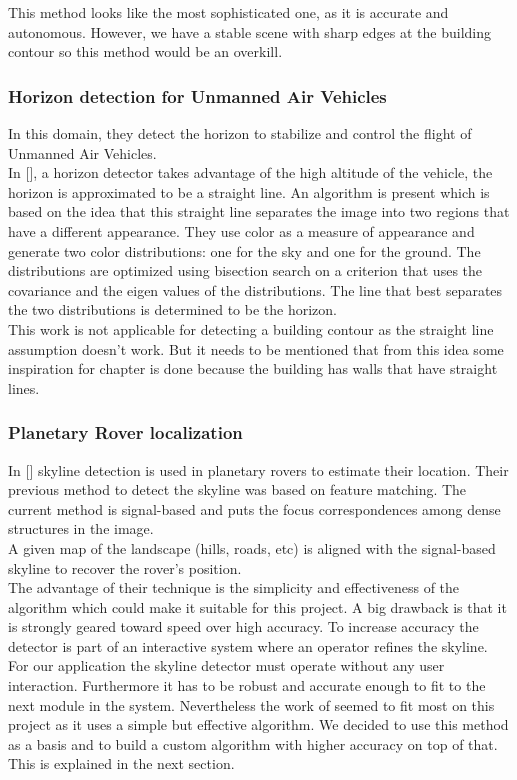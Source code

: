 This method looks like the most sophisticated one, as it is accurate and
autonomous. However, we have a stable scene with sharp edges at the
building contour so this method would be an overkill.  %


\subsubsection{Horizon detection for Unmanned Air Vehicles}
In this domain, they detect the horizon to stabilize and control the flight of Unmanned Air Vehicles.\\  
In [], %
a horizon detector takes advantage of the high altitude of the vehicle, the
horizon is approximated to be a straight line.  An algorithm is present which is
based on the idea that this straight line separates the image into two regions
that have a different appearance. They use color as a measure of appearance and
generate two color distributions: one for the sky and one for the ground. The
distributions are optimized using bisection search on a criterion that uses the
covariance and the eigen values of the distributions. The line that best
separates the two distributions is determined to be the horizon.\\

This work is not applicable for detecting a building contour as the
straight line assumption doesn't work. But it needs to be mentioned that from this
idea some inspiration for chapter %
is done because the building has walls that have straight lines.


\subsubsection{Planetary Rover localization}
In [] %
skyline detection is used in planetary rovers to estimate their location.  Their
previous method to detect the skyline was based on feature matching. The current
method is signal-based and puts the focus correspondences among dense structures
in the image.\\
A given map of the landscape (hills, roads, etc) is aligned with the
signal-based skyline to recover the rover's position.\\

The advantage of their technique is the simplicity and effectiveness of the
algorithm which could make it suitable for this project.  A big drawback is that
it is strongly geared toward speed over high accuracy. To increase accuracy the
detector is part of an interactive system where an operator refines the skyline.
For our application the skyline detector must operate without any user
interaction. Furthermore it has to be robust and accurate enough to fit to the next module
in the system.  Nevertheless the work of 
seemed to fit most on this project as it uses a simple but effective algorithm. 
We decided to use this method as a basis and to build a custom algorithm with
higher accuracy on top of that. This is explained in the next section.


